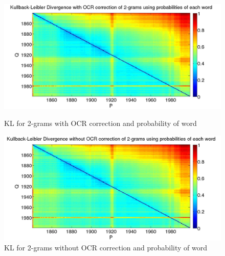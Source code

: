 \begin{figure}[h!]
    \begin{minipage}[b]{0.48\linewidth}
        \includegraphics[scale=0.15]{Pictures/kullback-leibler/KL_2-grams_with_correction_proba.jpg}
        \caption{KL for 2-grams with OCR correction and probability of word}
        \label{KL-PC2}
    \end{minipage}\hfill
    \begin{minipage}[b]{0.5\linewidth}
        \includegraphics[scale=0.15]{Pictures/kullback-leibler/KL_2-grams_without_correction_proba.jpg}
        \caption{KL for 2-grams without OCR correction and probability of word}
        \label{KL-PN2}
    \end{minipage}\hfill
\end{figure}

